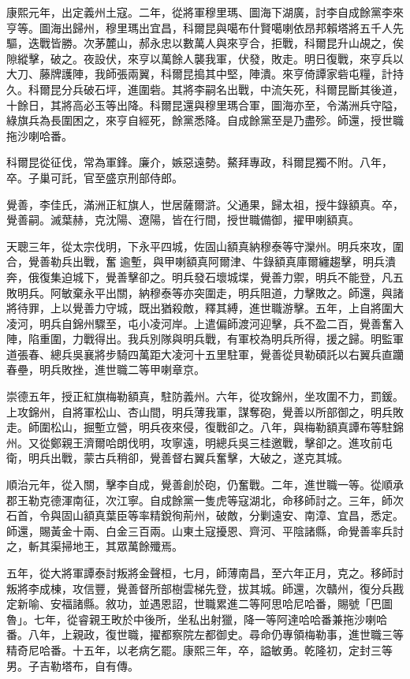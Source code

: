 \begin{pinyinscope}
康熙元年，出定義州土寇。二年，從將軍穆里瑪、圖海下湖廣，討李自成餘黨李來亨等。圖海出歸州，穆里瑪出宜昌，科爾昆與噶布什賢噶喇依昂邦賴塔將五千人先驅，迭戰皆勝。次茅麓山，郝永忠以數萬人與來亨合，拒戰，科爾昆升山覘之，俟隙縱擊，破之。夜設伏，來亨以萬餘人襲我軍，伏發，敗走。明日復戰，來亨兵以大刀、藤牌護陣，我師張兩翼，科爾昆搗其中堅，陣潰。來亨倚譚家砦屯糧，計持久。科爾昆分兵破石坪，進圍砦。其將李嗣名出戰，中流矢死，科爾昆斷其後道，十餘日，其將高必玉等出降。科爾昆還與穆里瑪合軍，圖海亦至，令滿洲兵守隘，綠旗兵為長圍困之，來亨自經死，餘黨悉降。自成餘黨至是乃盡殄。師還，授世職拖沙喇哈番。

科爾昆從征伐，常為軍鋒。廉介，嫉惡遠勢。鰲拜專政，科爾昆獨不附。八年，卒。子巢可託，官至盛京刑部侍郎。

覺善，李佳氏，滿洲正紅旗人，世居薩爾滸。父通果，歸太祖，授牛錄額真。卒，覺善嗣。滅葉赫，克沈陽、遼陽，皆在行間，授世職備御，擢甲喇額真。

天聰三年，從太宗伐明，下永平四城，佐固山額真納穆泰等守灤州。明兵來攻，圍合，覺善勒兵出戰，奮逾塹，與甲喇額真阿爾津、牛錄額真庫爾纏趨擊，明兵潰奔，俄復集迫城下，覺善擊卻之。明兵發石壞城堞，覺善力禦，明兵不能登，凡五敗明兵。阿敏棄永平出關，納穆泰等亦突圍走，明兵阻道，力擊敗之。師還，與諸將待罪，上以覺善力守城，既出猶殺敵，釋其縛，進世職游擊。五年，上自將圍大凌河，明兵自錦州驟至，屯小凌河岸。上遣偏師渡河迎擊，兵不盈二百，覺善奮入陣，陷重圍，力戰得出。我兵別隊與明兵戰，有軍校為明兵所得，援之歸。明監軍道張春、總兵吳襄將步騎四萬距大凌河十五里駐軍，覺善從貝勒碩託以右翼兵直躪春壘，明兵敗挫，進世職二等甲喇章京。

崇德五年，授正紅旗梅勒額真，駐防義州。六年，從攻錦州，坐攻圍不力，罰鍰。上攻錦州，自將軍松山、杏山間，明兵薄我軍，謀奪砲，覺善以所部御之，明兵敗走。師圍松山，掘塹立營，明兵夜來侵，復戰卻之。八年，與梅勒額真譚布等駐錦州。又從鄭親王濟爾哈朗伐明，攻寧遠，明總兵吳三桂邀戰，擊卻之。進攻前屯衛，明兵出戰，蒙古兵稍卻，覺善督右翼兵奮擊，大破之，遂克其城。

順治元年，從入關，擊李自成，覺善創於砲，仍奮戰。二年，進世職一等。從順承郡王勒克德渾南征，次江寧。自成餘黨一隻虎等寇湖北，命移師討之。三年，師次石首，令與固山額真葉臣等率精銳徇荊州，破敵，分剿遠安、南漳、宜昌，悉定。師還，賜黃金十兩、白金三百兩。山東土寇擾恩、齊河、平陰諸縣，命覺善率兵討之，斬其渠掃地王，其眾萬餘殲焉。

五年，從大將軍譚泰討叛將金聲桓，七月，師薄南昌，至六年正月，克之。移師討叛將李成棟，攻信豐，覺善督所部樹雲梯先登，拔其城。師還，次贛州，復分兵戡定新喻、安福諸縣。敘功，並遇恩詔，世職累進二等阿思哈尼哈番，賜號「巴圖魯」。七年，從睿親王畋於中後所，坐私出射獵，降一等阿達哈哈番兼拖沙喇哈番。八年，上親政，復世職，擢都察院左都御史。尋命仍專領梅勒事，進世職三等精奇尼哈番。十五年，以老病乞罷。康熙三年，卒，謚敏勇。乾隆初，定封三等男。子吉勒塔布，自有傳。


\end{pinyinscope}
